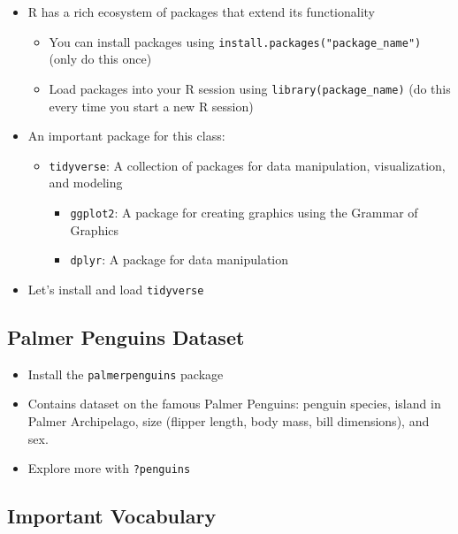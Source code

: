 \documentclass[
]{article}
\providecommand{\tightlist}{%
  \setlength{\itemsep}{0pt}\setlength{\parskip}{0pt}}
\begin{document}
\begin{itemize}
\tightlist
\item
  R has a rich ecosystem of packages that extend its functionality

  \begin{itemize}
  \tightlist
  \item
    You can install packages using
    \texttt{install.packages("package\_name")} (only do this once)
  \item
    Load packages into your R session using
    \texttt{library(package\_name)} (do this every time you start a new
    R session)
  \end{itemize}
\item
  An important package for this class:

  \begin{itemize}
  \tightlist
  \item
    \texttt{tidyverse}: A collection of packages for data manipulation,
    visualization, and modeling

    \begin{itemize}
    \tightlist
    \item
      \texttt{ggplot2}: A package for creating graphics using the
      Grammar of Graphics
    \item
      \texttt{dplyr}: A package for data manipulation
    \end{itemize}
  \end{itemize}
\item
  Let's install and load \texttt{tidyverse}
\end{itemize}

\subsection{Palmer Penguins Dataset}\label{palmer-penguins-dataset}

\begin{itemize}
\tightlist
\item
  Install the \texttt{palmerpenguins} package
\item
  Contains dataset on the famous Palmer Penguins: penguin species,
  island in Palmer Archipelago, size (flipper length, body mass, bill
  dimensions), and sex.
\item
  Explore more with \texttt{?penguins}
\end{itemize}

\subsection{Important Vocabulary}\label{important-vocabulary}
\end{document}
